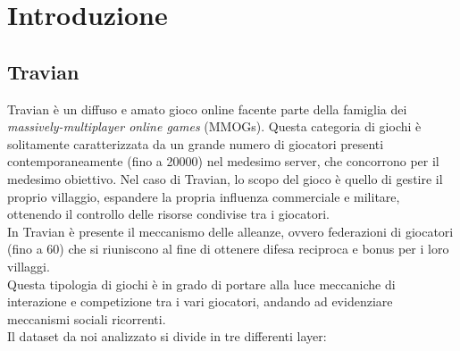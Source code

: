 \chapter{Introduzione}
\section{Travian}
Travian è un diffuso e amato gioco online facente parte della famiglia dei \textit{massively-multiplayer online games} (MMOGs).
Questa categoria di giochi è solitamente caratterizzata da un grande numero di giocatori presenti contemporaneamente (fino a 20000) nel medesimo server, che concorrono per il medesimo obiettivo.
Nel caso di Travian, lo scopo del gioco è quello di gestire il proprio villaggio, espandere la propria influenza commerciale e militare, ottenendo il controllo delle risorse condivise tra i giocatori.\\
In Travian è presente il meccanismo delle alleanze, ovvero federazioni di giocatori (fino a 60) che si riuniscono al fine di ottenere difesa reciproca e bonus per i loro villaggi.\\
Questa tipologia di giochi è in grado di portare alla luce meccaniche di interazione e competizione tra i vari giocatori, andando ad evidenziare meccanismi sociali ricorrenti.\\

Il dataset da noi analizzato si divide in tre differenti layer:

